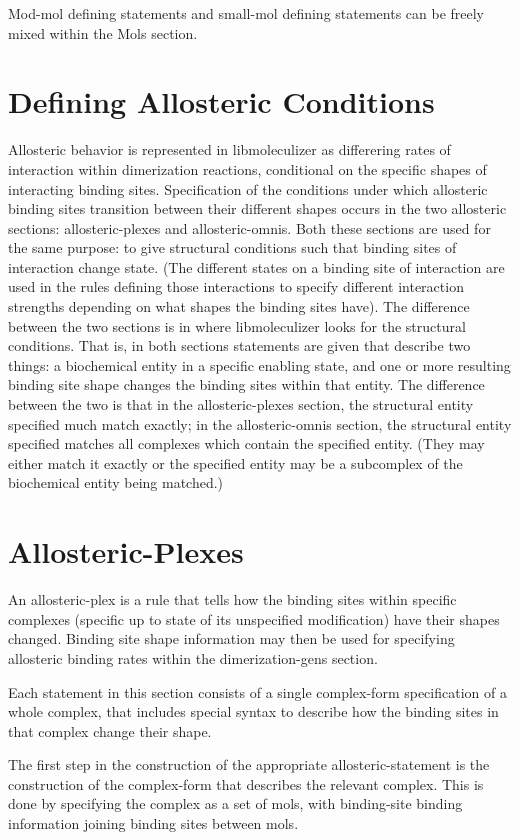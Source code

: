 Mod-mol defining statements and small-mol defining statements can be
freely mixed within the Mols section.

\section{Defining Allosteric Conditions}
Allosteric behavior is represented in libmoleculizer as differering
rates of interaction within dimerization reactions, conditional on the
specific shapes of interacting binding sites.  Specification of the
conditions under which allosteric binding sites transition between
their different shapes occurs in the two allosteric sections:
allosteric-plexes and allosteric-omnis.  Both these sections are used
for the same purpose: to give structural conditions such that binding
sites of interaction change state.  (The different states on a binding
site of interaction are used in the rules defining those interactions
to specify different interaction strengths depending on what shapes
the binding sites have).  The difference between the two sections is
in where libmoleculizer looks for the structural conditions.  That is,
in both sections statements are given that describe two things: a
biochemical entity in a specific enabling state, and one or more
resulting binding site shape changes the binding sites within that
entity.  The difference between the two is that in the
allosteric-plexes section, the structural entity specified much match
exactly; in the allosteric-omnis section, the structural entity
specified matches all complexes which contain the specified entity.
(They may either match it exactly or the specified entity may be a
subcomplex of the biochemical entity being matched.)

\section{Allosteric-Plexes}
An allosteric-plex is a rule that tells how the binding sites within
specific complexes (specific up to state of its unspecified
modification) have their shapes changed.  Binding site shape
information may then be used for specifying allosteric binding rates
within the dimerization-gens section.

Each statement in this section consists of a single complex-form
specification of a whole complex, that includes special syntax to
describe how the binding sites in that complex change their shape.

The first step in the construction of the appropriate
allosteric-statement is the construction of the complex-form that
describes the relevant complex.  This is done by specifying the
complex as a set of mols, with binding-site binding information
joining binding sites between mols.  


